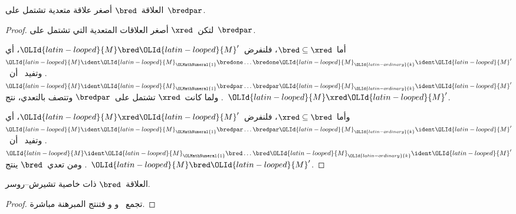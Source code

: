 \documentclass[../../../include/open-logic-section]{subfiles}
\begin{document}
\begin{lem}
  العلاقة~$\bred$ أصغر علاقة متعدية تشتمل على~$\bredpar$.
\end{lem}

\begin{proof}
  لتكن~$\xred$ أصغر العلاقات المتعدية التي تشتمل على~$\bredpar$.

  أما~$\bred \subseteq \xred$، فلنفرض~$\OLId{latin-looped}{M} \bred \OLId{latin-looped}{M}'$، أي
  $\OLId{latin-looped}{M} \ident \OLId{latin-looped}{M}_\OLMathNumeral{1} \bredone \dots \bredone \OLId{latin-looped}{M}_\OLId{latin-ordinary}{k} \ident \OLId{latin-looped}{M}'$.
  وتفيد~ أن~$\OLId{latin-looped}{M} \ident \OLId{latin-looped}{M}_\OLMathNumeral{1} \bredpar \dots \bredpar \OLId{latin-looped}{M}_\OLId{latin-ordinary}{k} \ident \OLId{latin-looped}{M}'$.
  ولما كانت~$\xred$ تشتمل على~$\bredpar$ وتتصف بالتعدي، نتج~$\OLId{latin-looped}{M} \xred \OLId{latin-looped}{M}'$.

  وأما~$\xred \subseteq \bred$، فلنفرض~$\OLId{latin-looped}{M} \xred \OLId{latin-looped}{M}'$، أي
  $\OLId{latin-looped}{M} \ident \OLId{latin-looped}{M}_\OLMathNumeral{1} \bredpar \dots \bredpar \OLId{latin-looped}{M}_\OLId{latin-ordinary}{k} \ident \OLId{latin-looped}{M}'$.
  وتفيد~ أن~$\OLId{latin-looped}{M} \ident \OLId{latin-looped}{M}_\OLMathNumeral{1} \bred \dots \bred \OLId{latin-looped}{M}_\OLId{latin-ordinary}{k} \ident \OLId{latin-looped}{M}'$.
  ومن تعدي~$\bred$ ينتج~$\OLId{latin-looped}{M} \bred \OLId{latin-looped}{M}'$.
\end{proof}

\begin{thm}
  العلاقة~$\bred$ ذات خاصية تشيرش--روسر.
\end{thm}

\begin{proof}
  تجمع~ و و
  فتنتج المبرهنة مباشرة.
\end{proof}
\end{document}
